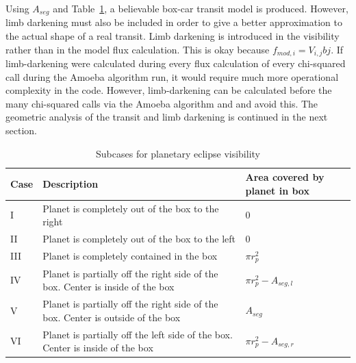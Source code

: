 \documentclass[iop]{emulateapj}
\newcommand{\fmod}{\mbox{$f_{mod,i}$}}
\begin{document}
Using $A_{seg} $ and Table~\ref{cases}, a believable box-car transit model is produced. However, limb darkening must also be included in order to give a better approximation to the actual shape of a real transit. Limb darkening is introduced in the visibility rather than in the model flux calculation. This is okay because $\fmod = V_{i,j} b{j}$. If limb-darkening were calculated during every flux calculation of every chi-squared call during the Amoeba algorithm run, it would require much more operational complexity in the code. However, limb-darkening can be calculated before the many chi-squared calls via the Amoeba algorithm and and avoid this.  The geometric analysis of the transit and limb darkening is continued in the next section.

\begin{table}
	\caption{Subcases for planetary eclipse visibility}
	\label{cases}
	\begin{center}
	\renewcommand{\arraystretch}{1.2}
		\begin{tabular}{| m{} | m{} | m{} |} %
			\hline
			\textbf{Case}    & \textbf{Description} & \textbf{Area covered by planet in box}\\ %
			\hline%
			I      &   Planet is completely out of the box to the right                                                                      & 0                                                           \\ \hline
			II     &   Planet is completely out of the box to the left                                                                         & 0                                                           \\ \hline
			III    &   Planet is completely contained in the box                                                                              & $\pi r_p^2$                                         \\ \hline
			IV    &   Planet is partially off the right side of the box. Center is inside of the box                       & $\pi r_p^2 - A_{seg,l}$                     \\ \hline
			V     &   Planet is partially off the right side of the box. Center is outside of the box                     & $A_{seg}$                                          \\ \hline
			VI    &   Planet is partially off the left side of the box. Center is inside of the box                          & $\pi r_p^2 - A_{seg,r}$                     \\ \hline

\end{tabular}
\end{center}
\end{table}
\end{document}

